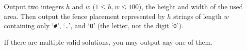 
    Output two integers $h$ and $w$ ($1 \leq h, w \leq 100$), the height and width of the used area.
    Then output the fence placement represented by $h$ strings of length $w$ containing only `\texttt{\#}', `\texttt{.}', and `\texttt{O}' (the letter, not the digit `\texttt{0}').

    If there are multiple valid solutions, you may output any one of them.
